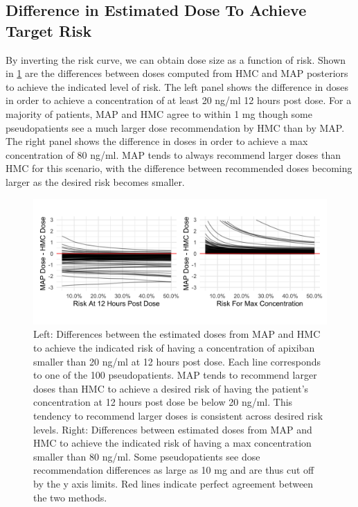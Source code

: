 \subsection*{Difference in Estimated Dose To Achieve Target Risk}


By inverting the risk curve, we can obtain dose size as a function of risk.  Shown in \cref{fig:fig7} are the differences between doses computed from HMC and MAP posteriors to achieve the indicated level of risk.  The left panel shows the difference in doses in order to achieve a concentration of at least 20 ng/ml 12 hours post dose. For a majority of patients, MAP and HMC agree to within 1 mg though some pseudopatients see a much larger dose recommendation by HMC than by MAP.  The right panel shows the difference in doses in order to achieve a max concentration of 80 ng/ml.  MAP tends to always recommend larger doses than HMC for this scenario, with the difference between recommended doses becoming larger as the desired risk becomes smaller.

\begin{figure}[h!]
	\centering
	\includegraphics[width=\linewidth]{figs/experiments}
	\caption{Left: Differences between the estimated doses from MAP and HMC to achieve the indicated risk of having a concentration of apixiban smaller than 20 ng/ml at 12 hours post dose. Each line corresponds to one of the 100 pseudopatients. MAP tends to recommend larger doses than HMC to achieve a desired risk of having the patient's concentration at 12 hours post dose be below 20 ng/ml. This tendency to recommend larger doses is consistent across desired risk levels.  Right: Differences between estimated doses from MAP and HMC to achieve the indicated risk of having a max concentration smaller than 80 ng/ml.  Some pseudopatients see dose recommendation differences as large as 10 mg and are thus cut off by the y axis limits. Red lines indicate perfect agreement between the two methods.}
	\label{fig:fig7}
\end{figure}


